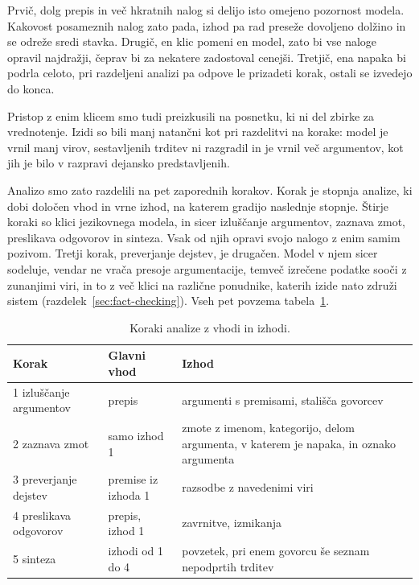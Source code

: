 \documentclass[a4paper, 12pt]{book}
\begin{document}
Prvič, dolg prepis in več hkratnih nalog si delijo isto omejeno pozornost modela. Kakovost posameznih nalog zato pada, izhod pa rad preseže dovoljeno
dolžino in se odreže sredi stavka. Drugič, en klic pomeni en model, zato bi vse naloge opravil najdražji, čeprav bi za nekatere zadostoval cenejši. Tretjič, ena
napaka bi podrla celoto, pri razdeljeni analizi pa odpove le prizadeti korak, ostali se izvedejo do konca.

Pristop z enim klicem smo tudi preizkusili na posnetku, ki ni del zbirke za vrednotenje. Izidi so bili manj natančni kot pri razdelitvi na korake: model je vrnil manj virov, sestavljenih trditev ni razgradil in je vrnil več argumentov, kot jih je bilo v razpravi dejansko predstavljenih. 

Analizo smo zato razdelili na pet zaporednih korakov. Korak je stopnja analize, ki dobi določen vhod in vrne izhod, na katerem gradijo naslednje stopnje.
Štirje koraki so klici jezikovnega modela, in sicer izluščanje argumentov, zaznava zmot, preslikava odgovorov in sinteza. Vsak od njih opravi svojo nalogo
z enim samim pozivom. Tretji korak, preverjanje dejstev, je drugačen. Model v njem sicer sodeluje, vendar ne vrača presoje argumentacije, temveč izrečene podatke sooči z zunanjimi viri, in to z več klici na različne ponudnike, katerih izide nato združi sistem (razdelek~\ref{sec:fact-checking}). Vseh pet povzema
tabela~\ref{tbl:koraki}.
\begin{table}[H]
\centering
\small
{}
\begin{tabular}{@{}p{}p{}p{}@{}}
\toprule
Korak & Glavni vhod & Izhod \\
\midrule
1 izluščanje argumentov & prepis & argumenti s premisami, stališča govorcev \\
\midrule
2 zaznava zmot & samo izhod 1 & zmote z imenom, kategorijo, delom argumenta, v katerem je napaka, in oznako argumenta \\
\midrule
3 preverjanje dejstev & premise iz izhoda 1 & razsodbe z navedenimi viri \\
\midrule
4 preslikava odgovorov & prepis, izhod 1 & zavrnitve, izmikanja \\
\midrule
5 sinteza & izhodi od 1 do 4 & povzetek, pri enem govorcu še seznam nepodprtih trditev \\
\bottomrule
\end{tabular}
\caption{Koraki analize z vhodi in izhodi.}
\label{tbl:koraki}
\end{table}
\end{document}
